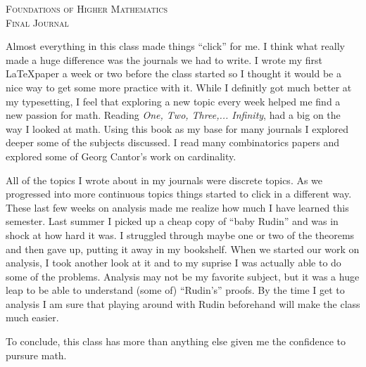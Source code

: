 \documentclass{article}
\begin{document}

\begin{center}
\textsc{\Large Foundations of Higher Mathematics}\\[.3cm]
\textsc{\Large Final Journal}\\[1cm]
\end{center}




Almost everything in this class made things ``click'' for me.
I think what really made a huge difference was the journals we had to write.
I wrote my first \LaTeX paper a week or two before the class started so I thought it would be a nice way to get some more practice with it.
While I definitly got much better at my typesetting, I feel that exploring a new topic every week helped me find a new passion for math.
Reading \textit{One, Two, Three,... Infinity}, had a big on the way I looked at math.
Using this book as my base for many journals I explored deeper some of the subjects discussed.
I read many combinatorics papers and explored some of Georg Cantor's work on cardinality.



All of the topics I wrote about in my journals were discrete topics.
As we progressed into more continuous topics things started to click in a different way.
These last few weeks on analysis made me realize how much I have learned this semester.
Last summer I picked up a cheap copy of ``baby Rudin'' and was in shock at how hard it was.
I struggled through maybe one or two of the theorems and then gave up, putting it away in my bookshelf.
When we started our work on analysis, I took another look at it and to my suprise I was actually able to do some of the problems.
Analysis may not be my favorite subject, but it was a huge leap to be able to understand (some of) ``Rudin's'' proofs.
By the time I get to analysis I am sure that playing around with Rudin beforehand will make the class much easier.


To conclude, this class has more than anything else given me the confidence to pursure math.
\end{document}
